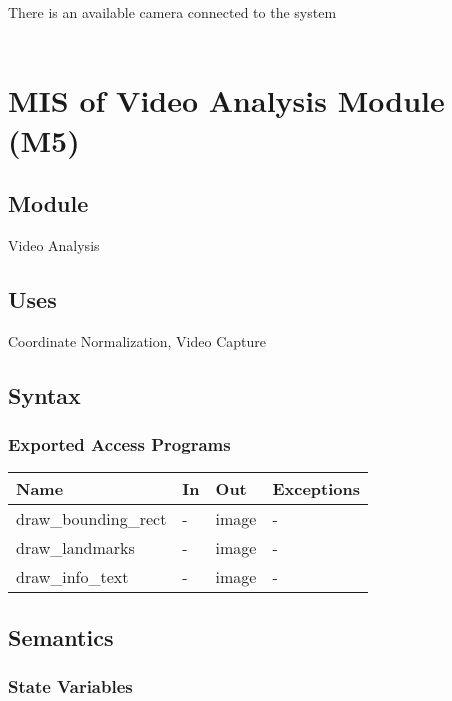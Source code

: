 \documentclass[12pt, titlepage]{article}
\begin{document}
There is an available camera connected to the system\\

~\newpage

\section{MIS of Video Analysis Module (M5)} \label{M5}

\subsection{Module}

Video Analysis\\

\subsection{Uses}

Coordinate Normalization, Video Capture\\

\subsection{Syntax}

\subsubsection{Exported Access Programs}

\begin{center}
\begin{tabular}{p{5cm} p{4cm} p{4cm} p{2cm}}
\hline
\textbf{Name} & \textbf{In} & \textbf{Out} & \textbf{Exceptions} \\
\hline
draw\_bounding\_rect & - & image & - \\
draw\_landmarks & - & image & - \\
draw\_info\_text & - & image & - \\
\hline
\end{tabular}
\end{center}

\subsection{Semantics}

\subsubsection{State Variables}
\end{document}

